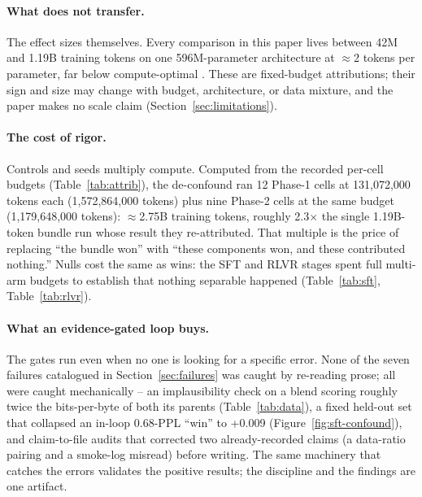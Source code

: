\paragraph{What does not transfer.}
The effect sizes themselves. Every comparison in this paper lives between
42M and 1.19B training tokens on one 596M-parameter architecture at
$\approx$2 tokens per parameter, far below compute-optimal
\citep{hoffmann2022training}. These are fixed-budget attributions; their
sign and size may change with budget, architecture, or data mixture, and
the paper makes no scale claim (Section~\ref{sec:limitations}).

\paragraph{The cost of rigor.}
Controls and seeds multiply compute. Computed from the recorded per-cell
budgets (Table~\ref{tab:attrib}), the de-confound ran 12 Phase-1 cells at
131,072,000 tokens each (1,572,864,000 tokens) plus nine Phase-2 cells at
the same budget (1,179,648,000 tokens): $\approx$2.75B training tokens,
roughly 2.3$\times$ the single 1.19B-token bundle run whose result they
re-attributed. That multiple is the price of replacing ``the bundle won''
with ``these components won, and these contributed nothing.'' Nulls cost
the same as wins: the SFT and RLVR stages spent full multi-arm budgets to
establish that nothing separable happened (Table~\ref{tab:sft},
Table~\ref{tab:rlvr}).

\paragraph{What an evidence-gated loop buys.}
The gates run even when no one is looking for a specific error. None of
the seven failures catalogued in Section~\ref{sec:failures} was caught by
re-reading prose; all were caught mechanically -- an implausibility check
on a blend scoring roughly twice the bits-per-byte of both its parents
(Table~\ref{tab:data}), a fixed held-out set that collapsed an in-loop
0.68-PPL ``win'' to +0.009 (Figure~\ref{fig:sft-confound}), and
claim-to-file audits that corrected two already-recorded claims (a
data-ratio pairing and a smoke-log misread) before writing. The same
machinery that catches the errors validates the positive results; the
discipline and the findings are one artifact.
